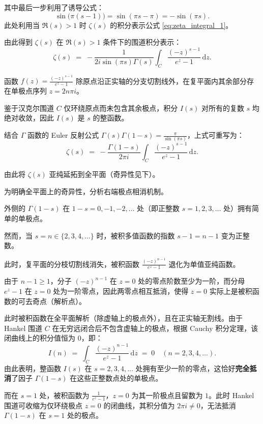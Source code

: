 其中最后一步利用了诱导公式：
\[
  \sin\!\big(\pi(s-1)\big) = \sin(\pi s - \pi) = -\sin(\pi s).
\]
此处利用当 $\Re(s)>1$ 时 $\zeta(s)$ 的积分表示公式 \eqref{eq:zeta_integral_1}。

由此得到 $\zeta(s)$ 在 $\Re(s)>1$ 条件下的围道积分表示：
\begin{equation}
\label{eq:analytic_cont_first}
  \zeta(s) \;=\; -\frac{1}{2i\sin(\pi s)\Gamma(s)}  \int_C \frac{(-z)^{s-1}}{e^z - 1} \,\mathrm{d}z.
\end{equation}

函数 $f(z)=\frac{(-z)^{s-1}}{e^z - 1}$ 除原点沿正实轴的分支切割线外，在复平面内其余部分存在单极点序列 $z=2n\pi i$。

鉴于汉克尔围道 $C$ 仅环绕原点而未包含其余极点，积分 $I(s)$ 对所有的复数 $s$ 均绝对收敛，因此 $I(s)$ 是 $s$ 的整函数。

结合 $\Gamma$ 函数的 Euler 反射公式 $\Gamma(s)\Gamma(1-s) = \frac{\pi}{\sin(\pi s)}$，上式可重写为：
\begin{equation}
\label{eq:zeta_contour_gamma}
  \zeta(s) \;=\; -\frac{\Gamma(1-s)}{2\pi i}  \int_C \frac{(-z)^{s-1}}{e^z - 1} \,\mathrm{d}z.
\end{equation}

由此将 $\zeta(s)$ 亚纯延拓到全平面（奇异性见下）。

为明确全平面上的奇异性，分析右端极点相消机制。

外侧的 $\Gamma(1-s)$ 在 $1-s = 0, -1, -2, \dots$ 处（即正整数 $s = 1, 2, 3, \dots$ 处）拥有简单的单极点。

然而，当 $s = n \in \{2, 3, 4, \dots\}$ 时，被积多值函数的指数 $s-1 = n-1$ 变为正整数。

此时，复平面的分枝切割线消失，被积函数 $\frac{(-z)^{n-1}}{e^z-1}$ 退化为单值亚纯函数。

由于 $n-1 \ge 1$，分子 $(-z)^{n-1}$ 在 $z=0$ 处的零点阶数至少为一阶，而分母 $e^z-1$ 在 $z=0$ 处为一阶零点，因此两零点相互抵消，使得 $z=0$ 实际上是被积函数的可去奇点（解析点）。

此时被积函数在全平面解析（除虚轴上的极点外），且在正实轴无割线。由于 Hankel 围道 $C$ 在无穷远闭合后不包含虚轴上的极点，根据 Cauchy 积分定理，该闭曲线上的积分值恒为 $0$，即：
\[
  I(n) \;=\;  \int_C \frac{(-z)^{n-1}}{e^z - 1} \,\mathrm{d}z \;=\; 0 \quad (n = 2, 3, 4, \dots).
\]
由此表明，整函数 $I(s)$ 在 $s = 2, 3, 4, \dots$ 处拥有至少一阶的零点，这恰好\textbf{完全抵消}了因子 $\Gamma(1-s)$ 在这些正整数点处的单极点。

而在 $s=1$ 处，被积函数为 $\frac{1}{e^z-1}$，$z=0$ 为其一阶极点且留数为 $1$。此时 Hankel 围道可收缩为仅环绕极点 $z=0$ 的闭曲线，其积分值为 $2\pi i \neq 0$，无法抵消 $\Gamma(1-s)$ 在 $s=1$ 处的极点。

